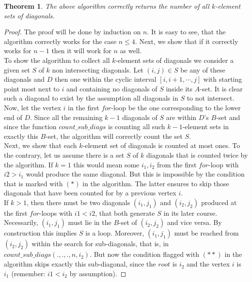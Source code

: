 \documentclass[17pt]{extarticle}
\newtheorem*{theorem*}{Theorem}
\begin{document}
\begin{theorem*}
	The above algorithm correctly returns the number of all $k$-element sets of diagonals.
\end{theorem*}
\begin{proof}
	The proof will be done by induction on $n$. It is easy to see, that the algorithm correctly works for the case $n\leq 4$. Next, we show that if it correctly works for $n-1$ then it will work for $n$ as well.\\
	To show the algorithm to collect all $k$-element sets of diagonals we consider a given set $S$ of $k$ non intersecting diagonals. Let $(i,j)\in S$ be any of these diagonals and $D$ then one within the cyclic interval $[i, i+1, \cdots, j]$ with starting point most next to $i$ and containing no diagonals of $S$ inside its $A$-set. It is clear such a diagonal to exist by the assumption all diagonals in $S$ to not intersect.
	Now, let the vertex $i$ in the first $for$-loop be the one corresponding to the lower end of $D$.
	Since all the remaining $k-1$ diagonals of $S$ are within $D$'s $B$-set and since the function $count\_sub\_diags$ is counting all such $k-1$-element sets in exactly this $B$-set, the algorithm will correctly count the set $S$.\\
	Next, we show that each $k$-element set of diagonals is counted at most ones. To the contrary, let us assume there is a set $S$ of $k$ diagonals that is counted twice by the algorithm. If $k=1$ this would mean some 
	$i_1, i_2$ from the first $for$-loop with $i2>i_1$ would produce the same diagonal. But this is impossible 
	by the condition that is marked with $(*)$ in the algorithm. The latter ensures to skip those diagonals that have been counted for by a previous vertex $i$.\\
	If $k>1$, then there must be two diagonals $(i_1, j_1)$ and $(i_2, j_2)$ produced at the first $for$-loops with $i1<i2$, that both generate $S$ in its later course. Necessarily, $(i_1, j_1)$ must lie in the $B$-set of $(i_2, j_2)$ and vice versa. By construction this implies $S$ is a loop. Moreover, $(i_1, j_1)$ must be reached from $(i_2, j_2)$ within the search for sub-diagonals, that is, in $count\_sub\_diags(.,.,.,n,i_2)$.
	But now the condition flagged with $(**)$ in the algorithm skips exactly this sub-diagonal, since the $root$ is $i_2$ and the vertex $i$ is $i_1$ (remember: $i1<i_2$ by assumption).
\end{proof}
\end{document}
